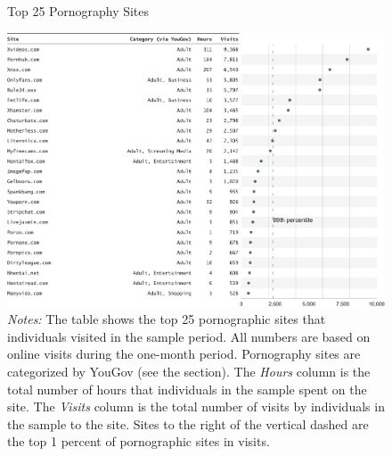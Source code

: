\documentclass[12pt, letterpaper]{article}
\begin{document}
\begin{figure}[ht]
	\centering
	\caption{Top 25 Pornography Sites}
	\includegraphics[width=\textwidth]{figs/top_25_adultsites.pdf}
	\caption*{\footnotesize \emph{Notes:} 
		The table shows the top 25 pornographic sites that individuals visited in the sample period.
            All numbers are based on online visits during the one-month period.
		Pornography sites are categorized by YouGov (see the  section).
    	The \emph{Hours} column is the total number of hours that individuals in the sample spent on the site. 
    	The \emph{Visits} column is the total number of visits by individuals in the sample to the site.
            Sites to the right of the vertical dashed are the top 1 percent of pornographic sites in visits.
	}
	\label{fig:top25_adult}
\end{figure}
\end{document}
